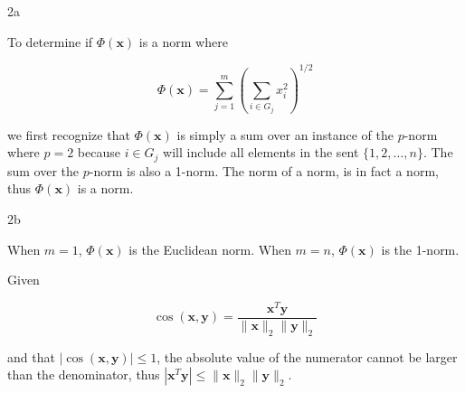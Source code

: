 \documentclass{article}
\begin{document}
\begin{homeworkProblem}

    \begin{homeworkSection}{2a}

        To determine if $\Phi(\bm{x})$ is a norm where 

        \begin{equation}
            \Phi(\bm{x}) = \sum_{j=1}^m \left(\sum_{i\in G_j} x_i^2
            \right)^{1/2}
        \end{equation}

        \noindent we first recognize that $\Phi(\bm{x})$ is simply a sum over
        an instance of the $p$-norm where $p = 2$ because $i \in G_j$ will
        include all elements in the sent $\{1, 2, \dots, n\}$. The sum over the
        $p$-norm is also a 1-norm. The norm of a norm, is in fact a norm, thus
        $\Phi(\bm{x})$ is a norm.
        
    \end{homeworkSection}

    \begin{homeworkSection}{2b}

        When $m = 1$, $\Phi(\bm{x})$ is the Euclidean norm.
        When $m = n$, $\Phi(\bm{x})$ is the 1-norm.

    \end{homeworkSection}

\end{homeworkProblem}

\begin{homeworkProblem}

    Given 
    
    \begin{equation}
        \cos(\bm{x},\bm{y}) = \frac{\bm{x}^T\bm{y}}{\|\bm{x}\|_2 \|\bm{y}\|_2}
    \end{equation}

    \noindent and that $|\cos(\bm{x},\bm{y})| \leq 1$, the absolute value of
    the numerator cannot be larger than the denominator, thus $|\bm{x}^T\bm{y}|
    \leq \|\bm{x}\|_2 \|\bm{y}\|_2$.

\end{homeworkProblem}
\end{document}
